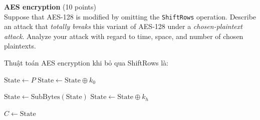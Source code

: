\begin{problem}{\bf AES encryption} (10 points)\\
Suppose that AES-128 is modified by omitting the \texttt{ShiftRows}
operation. Describe an attack that \emph{totally breaks} this variant
of AES-128 under a \emph{chosen-plaintext attack}. Analyze your attack with
regard to time, space, and number of chosen plaintexts.\end{problem}

\begin{loigiai}
  Thuật toán AES encryption khi bỏ qua ShiftRows là:\\
  \begin{algorithm}[H]

    $\text{State} \leftarrow P$\;
    $\text{State} \leftarrow \text{State} \oplus k_0$\;


    $\text{State} \leftarrow \text{SubBytes}(\text{State})$\;
    $\text{State} \leftarrow \text{State} \oplus k_h$\;

    $C \leftarrow \text{State}$\;


\end{algorithm}
\end{loigiai}
